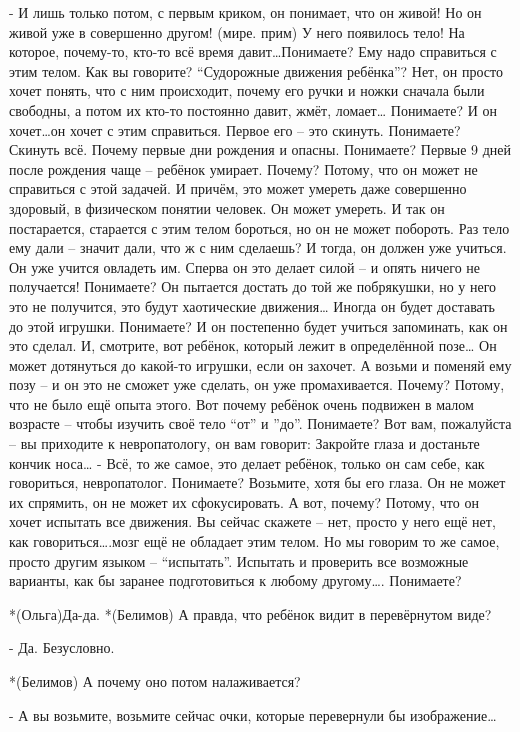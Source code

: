 - И лишь только потом, с первым криком, он понимает, что он живой! Но он живой уже в совершенно другом! (мире. прим) У него появилось тело! На которое, почему-то, кто-то всё время давит…Понимаете? Ему надо справиться с этим телом. Как вы говорите? “Судорожные движения ребёнка”? Нет, он просто хочет понять, что с ним происходит, почему его ручки и ножки сначала были свободны, а потом их кто-то постоянно давит, жмёт, ломает… Понимаете? И он хочет…он хочет с этим справиться. Первое его – это скинуть. Понимаете? Скинуть всё. Почему первые дни рождения и опасны. Понимаете? Первые 9 дней после рождения  чаще – ребёнок умирает. Почему? Потому, что он может не справиться с этой задачей. И причём, это может умереть даже совершенно здоровый, в физическом понятии человек. Он может умереть. И так он постарается, старается с этим телом бороться, но он не может побороть.  Раз тело ему дали – значит дали, что ж с ним сделаешь? И тогда, он должен уже учиться. Он уже учится овладеть им. Сперва он это делает силой – и опять ничего не получается! Понимаете? Он пытается достать до той же побрякушки, но у него это не получится, это будут хаотические движения… Иногда он будет доставать до этой игрушки. Понимаете? И он постепенно будет учиться запоминать, как он это сделал. И, смотрите, вот ребёнок, который лежит в определённой позе… Он может дотянуться до какой-то игрушки, если он захочет. А возьми и поменяй ему позу – и он это не сможет уже сделать, он уже промахивается. Почему? Потому, что не было ещё опыта этого. Вот почему ребёнок очень подвижен в малом возрасте – чтобы изучить своё тело “от” и ”до”. Понимаете? Вот вам, пожалуйста – вы приходите к невропатологу, он вам говорит: Закройте глаза и достаньте кончик носа… - Всё, то же самое, это делает ребёнок, только он сам себе, как говориться, невропатолог. Понимаете? Возьмите, хотя бы его глаза. Он не может их спрямить, он не может их сфокусировать. А вот, почему? Потому, что он хочет испытать все движения. Вы сейчас скажете – нет, просто у него ещё нет, как говориться….мозг ещё не обладает этим телом. Но мы говорим то же самое, просто другим языком – “испытать”. Испытать и проверить все возможные варианты, как бы заранее подготовиться к любому другому…. Понимаете?

*(Ольга)Да-да.
*(Белимов) А правда, что ребёнок видит в перевёрнутом виде?

- Да. Безусловно.

*(Белимов) А почему оно потом налаживается?

- А вы возьмите, возьмите сейчас очки, которые перевернули бы изображение…

